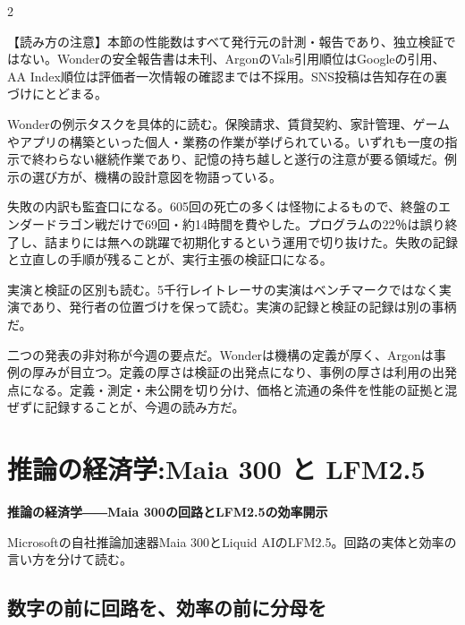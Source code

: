 \documentclass[lualatex,a4paper,10pt]{jlreq}
\begin{document}
\begin{multicols}{2} %

\begin{tcolorbox}[colback=SurveySoft,colframe=SurveyRule,arc=1mm,boxrule=0.4pt,left=2mm,right=2mm]
【読み方の注意】本節の性能数はすべて発行元の計測・報告であり、独立検証ではない。Wonderの安全報告書は未刊、ArgonのVals引用順位はGoogleの引用、AA Index順位は評価者一次情報の確認までは不採用。SNS投稿は告知存在の裏づけにとどまる。
\end{tcolorbox}
\cite{B01,B62,B63,B02,B64,B03,B05,B65,B08,B04,B07,B06}

Wonderの例示タスクを具体的に読む。保険請求、賃貸契約、家計管理、ゲームやアプリの構築といった個人・業務の作業が挙げられている。いずれも一度の指示で終わらない継続作業であり、記憶の持ち越しと遂行の注意が要る領域だ。例示の選び方が、機構の設計意図を物語っている。
\cite{B01,B62,B63,B02,B64,B03}


失敗の内訳も監査口になる。605回の死亡の多くは怪物によるもので、終盤のエンダードラゴン戦だけで69回・約14時間を費やした。プログラムの22％は誤り終了し、詰まりには無への跳躍で初期化するという運用で切り抜けた。失敗の記録と立直しの手順が残ることが、実行主張の検証口になる。
\cite{B05,B65,B08,B04,B07,B06}


実演と検証の区別も読む。5千行レイトレーサの実演はベンチマークではなく実演であり、発行者の位置づけを保って読む。実演の記録と検証の記録は別の事柄だ。
\cite{B05,B65,B08,B04,B07,B06}


二つの発表の非対称が今週の要点だ。Wonderは機構の定義が厚く、Argonは事例の厚みが目立つ。定義の厚さは検証の出発点になり、事例の厚さは利用の出発点になる。定義・測定・未公開を切り分け、価格と流通の条件を性能の証拠と混ぜずに記録することが、今週の読み方だ。
\cite{B01,B62,B63,B02,B64,B03,B05,B65,B08,B04,B07,B06}


\section{推論の経済学:Maia 300 と LFM2.5}
\label{sec:P2}

{\Large\bfseries 推論の経済学――Maia 300の回路とLFM2.5の効率開示\par}
\smallskip
{\color{SurveyMuted}Microsoftの自社推論加速器Maia 300とLiquid AIのLFM2.5。回路の実体と効率の言い方を分けて読む。\par}
\bigskip

\subsection*{数字の前に回路を、効率の前に分母を}


\end{multicols}
\end{document}
